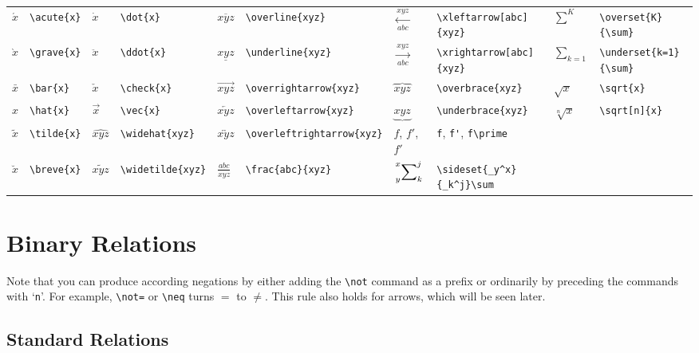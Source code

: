 \documentclass[10pt, english]{article}
\begin{document}
	\begin{center}
		\scriptsize
	\begin{tabular}{ll|ll|ll|ll|ll}
		$\acute{x}$ & \verb|\acute{x}| & $\dot{x}$ & \verb|\dot{x}| & $\overline{xyz}$ & \verb|\overline{xyz}| & $\xleftarrow[abc]{xyz}$ & \verb|\xleftarrow[abc]{xyz}| & $\overset{K}{\sum}$ & \verb|\overset{K}{\sum}| \\
		$\grave{x}$ & \verb|\grave{x}| & $\ddot{x}$ & \verb|\ddot{x}| & $\underline{xyz}$ & \verb|\underline{xyz}| & $\xrightarrow[abc]{xyz}$ & \verb|\xrightarrow[abc]{xyz}| & $\underset{k=1}{\sum}$ & \verb|\underset{k=1}{\sum}| \\
		$\bar{x}$ & \verb|\bar{x}| & $\check{x}$ & \verb|\check{x}| & $\overrightarrow{xyz}$ & \verb|\overrightarrow{xyz}| & $\overbrace{xyz}$ & \verb|\overbrace{xyz}| & $\sqrt{x}$ & \verb|\sqrt{x}| \\
		$\hat{x}$ & \verb|\hat{x}| & $\vec{x}$ & \verb|\vec{x}| & $\overleftarrow{xyz}$ & \verb|\overleftarrow{xyz}| & $\underbrace{xyz}$ & \verb|\underbrace{xyz}| & $\sqrt[n]{x}$ & \verb|\sqrt[n]{x}| \\
		$\tilde{x}$ & \verb|\tilde{x}| & $\widehat{xyz}$ & \verb|\widehat{xyz}| & $\overleftrightarrow{xyz}$ & \verb|\overleftrightarrow{xyz}| & $f$, $f'$, $f\prime$ & \verb|f|, \verb|f'|, \verb|f\prime| \\
		$\breve{x}$ & \verb|\breve{x}| & $\widetilde{xyz}$ & \verb|\widetilde{xyz}| & $\frac{abc}{xyz}$ & \verb|\frac{abc}{xyz}| & $\sideset{_y^x}{_k^j}\sum$ & \verb|\sideset{_y^x}{_k^j}\sum| \\
	\end{tabular}
	\end{center}

\section{Binary Relations}

	Note that you can produce according negations by either adding the \verb|\not| command as a prefix or ordinarily by preceding the commands with `\verb|n|'. For example, \verb|\not=| or \verb|\neq| turns $=$ to $\neq$. This rule also holds for arrows, which will be seen later.

	\subsection{Standard Relations}
\end{document}
